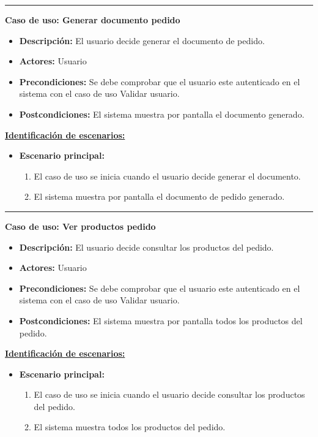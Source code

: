 \smallskip
\hrule height 1pt
\smallskip
\textbf{Caso de uso: Generar documento pedido}
\begin{itemize}\renewcommand{\labelitemi}{$\cdot$}
 \item \textbf{Descripción:} El usuario decide generar el documento de pedido.
  \item \textbf{Actores:} Usuario
  \item \textbf{Precondiciones:} Se debe comprobar que el usuario este autenticado en el sistema con el caso de uso Validar usuario.
  \item \textbf{Postcondiciones:} El sistema muestra por pantalla el documento generado.
\end{itemize}
\underline{\textbf{Identificación de escenarios:}}
\begin{itemize}\renewcommand{\labelitemi}{$\circ$}
 \item \textbf{Escenario principal:}
         \begin{enumerate}
          \item El caso de uso se inicia cuando el usuario decide generar el documento.
          \item El sistema muestra por pantalla el documento de pedido generado.
         \end{enumerate}
\end{itemize}

\smallskip
\hrule height 1pt
\smallskip
\textbf{Caso de uso: Ver productos pedido}
\begin{itemize}\renewcommand{\labelitemi}{$\cdot$}
 \item \textbf{Descripción:} El usuario decide consultar los productos del pedido.
  \item \textbf{Actores:} Usuario
  \item \textbf{Precondiciones:} Se debe comprobar que el usuario este autenticado en el sistema con el caso de uso Validar usuario.
  \item \textbf{Postcondiciones:} El sistema muestra por pantalla todos los productos del pedido.
\end{itemize}
\underline{\textbf{Identificación de escenarios:}}
\begin{itemize}\renewcommand{\labelitemi}{$\circ$}
 \item \textbf{Escenario principal:}
         \begin{enumerate}
          \item El caso de uso se inicia cuando el usuario decide consultar los productos del pedido.
          \item El sistema muestra todos los productos del pedido.
         \end{enumerate}
\end{itemize}

